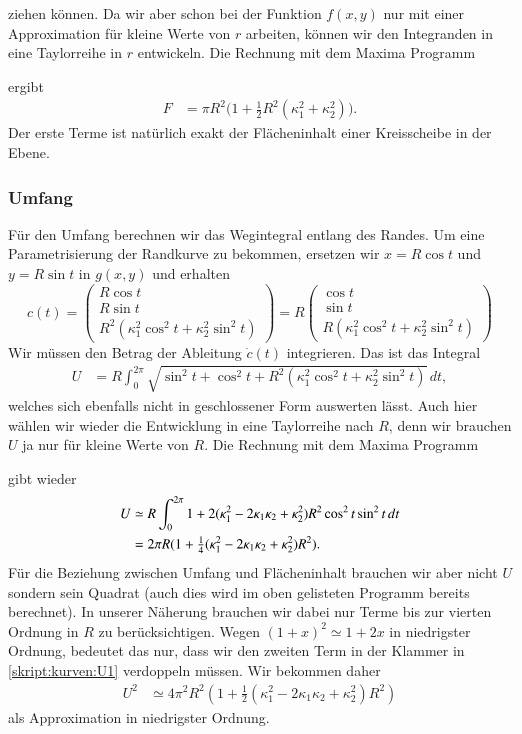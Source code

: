ziehen können.
Da wir aber schon bei der Funktion $f(x,y)$ nur mit einer Approximation
für kleine Werte von $r$ arbeiten, können wir den Integranden in eine
Taylorreihe in $r$ entwickeln.
Die Rechnung mit dem Maxima Programm

ergibt
\begin{align*}
F
&=
\pi R^2
\bigl(
1
+
{\textstyle\frac12} R^2(\kappa_1^2+\kappa_2^2)
\bigr).
\end{align*}
Der erste Terme ist natürlich exakt der Flächeninhalt einer Kreisscheibe
in der Ebene.

\subsubsection{Umfang}
Für den Umfang berechnen wir das Wegintegral entlang des Randes.
Um eine Parametrisierung der Randkurve zu bekommen,
ersetzen wir $x=R\cos t$ und $y=R\sin t$ in $g(x,y)$ und erhalten
\[
c(t)
=
\begin{pmatrix}
R\cos t\\ R\sin t\\ R^2(\kappa_1^2\cos^2 t + \kappa_2^2\sin^2 t)
\end{pmatrix}
=
R
\begin{pmatrix}
\cos t\\ \sin t\\ R(\kappa_1^2\cos^2 t + \kappa_2^2\sin^2 t)
\end{pmatrix}
\]
Wir müssen den Betrag der Ableitung $\dot c(t)$ integrieren.
Das ist das Integral
\begin{align*}
U
&=
R
\int_0^{2\pi}
\sqrt{
\sin^2 t + \cos^2 t 
+ R^2(\kappa_1^2 \cos^2 t + \kappa_2^2\sin^2 t)
}
\,dt,
\end{align*}
welches sich ebenfalls nicht in geschlossener Form auswerten lässt.
Auch hier wählen wir wieder die Entwicklung in eine Taylorreihe nach $R$,
denn wir brauchen $U$ ja nur für kleine Werte von $R$.
Die Rechnung mit dem Maxima Programm

gibt wieder
\begin{align}
U
&\simeq
R
\int_0^{2\pi}
1 + 2(\kappa_1^2 - 2\kappa_1\kappa_2 + \kappa_2^2)R^2 \cos^2 t\sin^2 t
\,dt
\notag
\\
&=
2\pi R
(
1
+ 
{\textstyle \frac14}(\kappa_1^2 -2\kappa_1\kappa_2+\kappa_2^2) R^2
).
\label{skript:kurven:U1}
\end{align}
Für die Beziehung zwischen Umfang und Flächeninhalt brauchen wir aber nicht
$U$ sondern sein Quadrat (auch dies wird im oben gelisteten Programm bereits
berechnet).
In unserer Näherung brauchen wir dabei nur Terme bis zur vierten Ordnung
in $R$ zu berücksichtigen.
Wegen $(1+x)^2 \simeq 1+2x$ in niedrigster Ordnung, bedeutet das nur,
dass wir den zweiten Term in der Klammer in \eqref{skript:kurven:U1}
verdoppeln müssen.
Wir bekommen daher
\begin{align*}
U^2
&\simeq
4\pi^2 R^2(
1
+
{\textstyle \frac12}
(\kappa_1^2-2\kappa_1\kappa_2 + \kappa_2^2)R^2
)
\end{align*}
als Approximation in niedrigster Ordnung.

